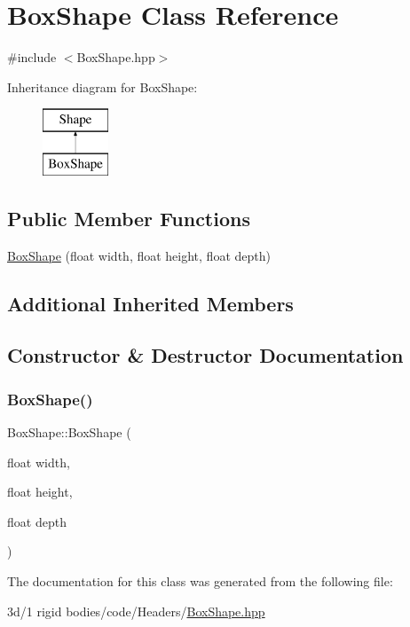 \hypertarget{class_box_shape}{}\section{Box\+Shape Class Reference}
\label{class_box_shape}


{\ttfamily \#include $<$Box\+Shape.\+hpp$>$}

Inheritance diagram for Box\+Shape\+:\begin{figure}[H]
\begin{center}
\leavevmode
\includegraphics[height=2.000000cm]{class_box_shape}
\end{center}
\end{figure}
\subsection*{Public Member Functions}
\begin{DoxyCompactItemize}
\item 
\mbox{\hyperlink{class_box_shape_a684f14be4d5600b88eb9a10019718097}{Box\+Shape}} (float width, float height, float depth)
\end{DoxyCompactItemize}
\subsection*{Additional Inherited Members}


\subsection{Constructor \& Destructor Documentation}
\mbox{\label{class_box_shape_a684f14be4d5600b88eb9a10019718097}} 
\subsubsection{\texorpdfstring{Box\+Shape()}{BoxShape()}}
{\footnotesize\ttfamily Box\+Shape\+::\+Box\+Shape (\begin{DoxyParamCaption}\item[{float}]{width,  }\item[{float}]{height,  }\item[{float}]{depth }\end{DoxyParamCaption})\hspace{0.3cm}{\ttfamily [inline]}}



The documentation for this class was generated from the following file\+:\begin{DoxyCompactItemize}
\item 
3d/1 rigid bodies/code/\+Headers/\mbox{\hyperlink{_box_shape_8hpp}{Box\+Shape.\+hpp}}\end{DoxyCompactItemize}

